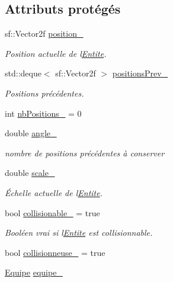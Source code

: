 \subsection*{Attributs protégés}
\begin{DoxyCompactItemize}
\item 
sf\+::\+Vector2f \hyperlink{class_entite_abbd554c4f122159a73cb113cc8de3860}{position\+\_\+}
\begin{DoxyCompactList}\small\item\em Position actuelle de l\textquotesingle{}\hyperlink{class_entite}{Entite}. \end{DoxyCompactList}\item 
std\+::deque$<$ sf\+::\+Vector2f $>$ \hyperlink{class_entite_a917f4b325c90fea530786637935eb1b5}{positions\+Prev\+\_\+}
\begin{DoxyCompactList}\small\item\em Positions précédentes. \end{DoxyCompactList}\item 
int \hyperlink{class_entite_aed4a409664f29d00d0ec0e021d9e53ec}{nb\+Positions\+\_\+} = 0
\item 
double \hyperlink{class_entite_a0ff0818c364a2d4282f99e309728f479}{angle\+\_\+}
\begin{DoxyCompactList}\small\item\em nombre de positions précédentes à conserver \end{DoxyCompactList}\item 
double \hyperlink{class_entite_aea089577c3fbaabb86f8edb015bc1e90}{scale\+\_\+}
\begin{DoxyCompactList}\small\item\em Échelle actuelle de l\textquotesingle{}\hyperlink{class_entite}{Entite}. \end{DoxyCompactList}\item 
bool \hyperlink{class_entite_a37bb9bd568e9e1c904eaa83ec49a2b16}{collisionable\+\_\+} = true
\begin{DoxyCompactList}\small\item\em Booléen vrai si l\textquotesingle{}\hyperlink{class_entite}{Entite} est collisionnable. \end{DoxyCompactList}\item 
bool \hyperlink{class_entite_a0a347fd96077f1f331ed17247840df06}{collisionneuse\+\_\+} = true
\item 
\hyperlink{constantes_8h_a08fa5554288d5031a8f3bb83cc04ee83}{Equipe} \hyperlink{class_entite_a5fe5eca94bde526873a68163a94011ef}{equipe\+\_\+}

\end{DoxyCompactItemize}
